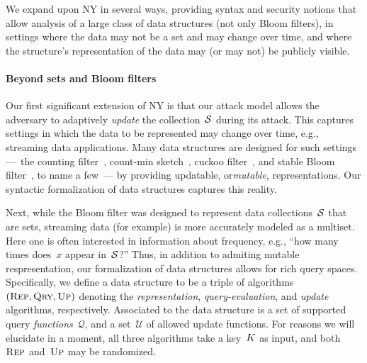 We expand upon NY in several ways, providing syntax and security
notions that allow analysis of a large class of data structures (not
only Bloom filters), in settings where the data may not be a set and
may change over time, and where the structure's representation of the data may (or may not) be publicly visible.
 
\paragraph{Beyond sets and Bloom filters}
Our first significant extension of NY is that our attack model allows the adversary to adaptively \emph{update} the
collection~$\mathcal{S}$ during its attack.  This captures settings in which
the data to be represented may change over time, e.g., streaming data applications.
Many data structures are designed for such settings ---~the counting filter~\cite{fan2000summary}, count-min
sketch~\cite{cormode2005improved}, cuckoo filter~\cite{fan2014cuckoo}, and
stable Bloom filter~\cite{deng2006approximately}, to name a few~--- by providing
updatable, or\emph{mutable}, representations.  Our syntactic formalization of
data structures captures this reality. 

%
Next, while the Bloom filter was designed to represent data collections~$\mathcal{S}$
that are sets, streaming data (for example) is more accurately 
modeled as a multiset.  Here one is often interested in information
about frequency, e.g., ``how many times does~$x$ appear
in~$\mathcal{S}$?''
Thus, in addition to admiting mutable respresentation, our
formalization of data structures allows for rich
query spaces.  Specifically, we define a data structure to be a triple of algorithms $(\textnormal{\textsc{Rep}},
\textnormal{\textsc{Qry}}, \textnormal{\textsc{Up}})$ denoting the \emph{representation}, \emph{query-evaluation}, and
\emph{update} algorithms, respectively. Associated to the data structure is a
set of supported query \emph{functions}~$\mathcal{Q}$, and a set~$\mathcal{U}$
of allowed update functions.  For reasons we will elucidate in a moment, all
three algorithms take a key~$K$ as input, and both~$\textnormal{\textsc{Rep}}$ and~$\textnormal{\textsc{Up}}$ may be
randomized.

